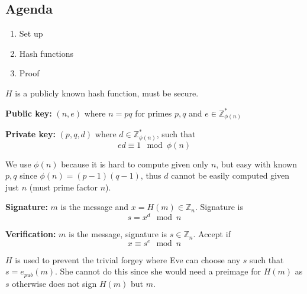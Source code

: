 

\subsection*{Agenda}
\begin{enumerate}
\item Set up
\item Hash functions
\item Proof
\end{enumerate}

$H$ is a publicly known hash function, must be secure.

\textbf{Public key:} $(n, e)$ where $n = pq$ for primes $p, q$ and $e \in \mathbb{Z}_{\phi(n)}^*$

\textbf{Private key:} $(p, q, d)$ where $d \in \mathbb{Z}_{\phi(n)}^*$, such that
\[ ed \equiv 1 \mod \phi(n) \]

We use $\phi(n)$ because it is hard to compute given only $n$, but easy with known $p, q$ since $\phi(n) = (p-1)(q-1)$, thus $d$ cannot be easily computed given just $n$ (must prime factor $n$).

\textbf{Signature:} $m$ is the message and $x = H(m) \in \mathbb{Z}_n$. Signature is
\[ s = x^d \mod n \]

\textbf{Verification:} $m$ is the message, signature is $s \in \mathbb{Z}_n$. Accept if
\[ x \equiv s^e \mod n \]

$H$ is used to prevent the trivial forgey where Eve can choose any $s$ such that $s = e_{pub}(m)$. She cannot do this since she would need a preimage for $H(m)$ as $s$ otherwise does not sign $H(m)$ but $m$.

